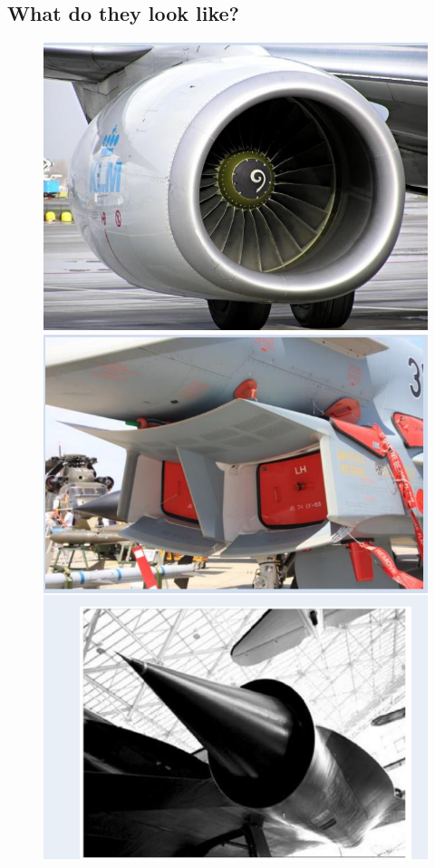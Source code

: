 \subsection{What do they look like?}
\begin{figure}[H]
    \centering
    \begin{minipage}{.5\textwidth}
        \centering
        \includegraphics[width=.8\linewidth]{./img/diagram40.png}
    \end{minipage}%
    \begin{minipage}{.5\textwidth}
        \centering
        \includegraphics[width=.8\linewidth]{./img/diagram41.png}
    \end{minipage}
\end{figure}
